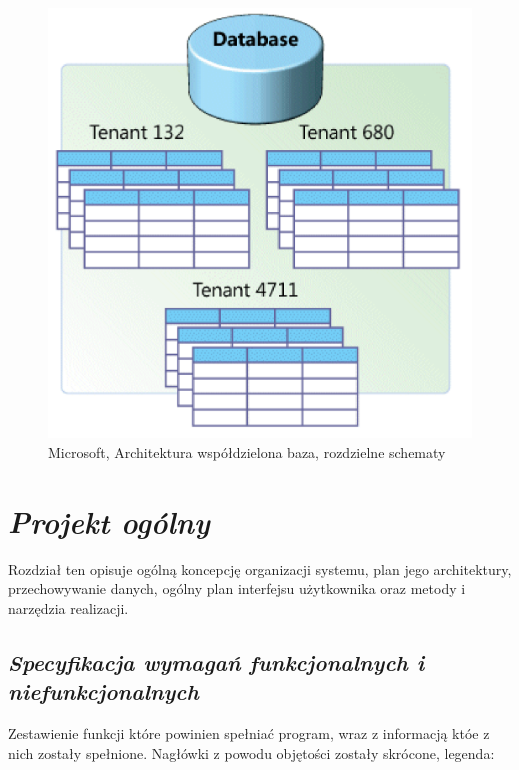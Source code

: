 \documentclass[a4paper,10pt, twoside]{report}
\newcommand{\customstylechapter}[1]{\large{\textit{#1}}}
\newcommand{\customstylesection}[1]{\textbf{\textit{#1}}}
\begin{document}
\begin{large}
\begin{figure}[H]           %
    \centering
    \includegraphics[width=12cm]{figures/multitenant_4.png}
    \caption{Microsoft, Architektura współdzielona baza, rozdzielne schematy}
    \label{fig:multitenant}
\end{figure}


\chapter{\customstylechapter{Projekt ogólny}}
{Rozdział ten opisuje ogólną koncepcję organizacji systemu, plan jego 
architektury, przechowywanie danych, ogólny plan interfejsu użytkownika oraz 
metody i narzędzia realizacji.}


\section{\customstylesection{Specyfikacja wymagań funkcjonalnych i niefunkcjonalnych}}
{Zestawienie funkcji które powinien spełniać program, wraz z informacją któe 
z nich zostały spełnione. Nagłówki z powodu objętości zostały skrócone, legenda:}


\end{large}
\end{document}
